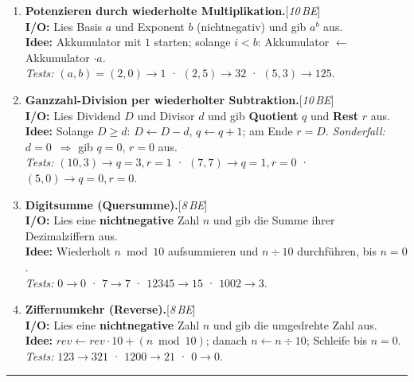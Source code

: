 \documentclass[11pt,a4paper]{scrartcl}
\newenvironment{aufgaben}{%
  \begin{enumerate}[leftmargin=*,label=\textbf{Aufgabe~\arabic*:}, itemsep=0.6em]
  }{\end{enumerate}}
\newcommand{\punkte}[1]{\hfill{\small[\textit{#1\,BE}]}}%
\begin{document}
  \begin{aufgaben}

    \item \textbf{Potenzieren durch wiederholte Multiplikation.}\punkte{10}\\
    \textbf{I/O:} Lies Basis $a$ und Exponent $b$ (nichtnegativ) und gib $a^b$ aus.\\
    \textbf{Idee:} Akkumulator mit $1$ starten; solange $i<b$: Akkumulator $\gets$ Akkumulator $\cdot a$.\\
    \emph{Tests:} $(a,b)=(2,0)\to 1$ \;·\; $(2,5)\to 32$ \;·\; $(5,3)\to 125$.

    \item \textbf{Ganzzahl-Division per wiederholter Subtraktion.}\punkte{10}\\
    \textbf{I/O:} Lies Dividend $D$ und Divisor $d$ und gib \textbf{Quotient} $q$ und \textbf{Rest} $r$ aus.\\
    \textbf{Idee:} Solange $D \ge d$: $D\gets D-d$, $q\gets q+1$; am Ende $r=D$. \emph{Sonderfall:} $d=0$~$\Rightarrow$ gib $q=0$, $r=0$ aus.\\
    \emph{Tests:} $(10,3)\to q=3, r=1$ \;·\; $(7,7)\to q=1, r=0$ \;·\; $(5,0)\to q=0, r=0$.

    \item \textbf{Digitsumme (Quersumme).}\punkte{8}\\
    \textbf{I/O:} Lies eine \textbf{nichtnegative} Zahl $n$ und gib die Summe ihrer Dezimalziffern aus.\\
    \textbf{Idee:} Wiederholt $n \bmod 10$ aufsummieren und $n \div 10$ durchführen, bis $n=0$.\\
    \emph{Tests:} $0\to 0$ \;·\; $7\to 7$ \;·\; $12345\to 15$ \;·\; $1002\to 3$.

    \item \textbf{Ziffernumkehr (Reverse).}\punkte{8}\\
    \textbf{I/O:} Lies eine \textbf{nichtnegative} Zahl $n$ und gib die umgedrehte Zahl aus.\\
    \textbf{Idee:} $rev \gets rev\cdot 10 + (n \bmod 10)$; danach $n \gets n \div 10$; Schleife bis $n=0$.\\
    \emph{Tests:} $123\to 321$ \;·\; $1200\to 21$ \;·\; $0\to 0$.

  \end{aufgaben}

  \vspace{0.3em}
  \hrule
  \vspace{0.6em}
\end{document}
